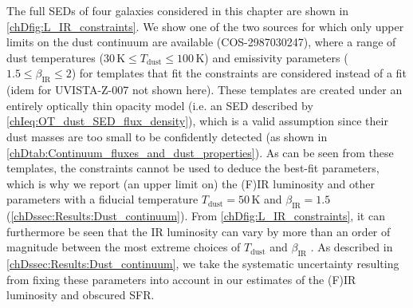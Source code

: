 The full SEDs of four galaxies considered in this chapter are shown in \cref{chDfig:L_IR_constraints}. We show one of the two sources for which only upper limits on the dust continuum are available (COS-2987030247), where a range of dust temperatures ($30 \, \mathrm{K} \leq T_\text{dust} \leq 100 \, \mathrm{K}$) and emissivity parameters ($1.5 \leq \beta_\text{IR} \leq 2$) for templates that fit the constraints are considered instead of a  fit (idem for UVISTA-Z-007 not shown here). These templates are created under an entirely optically thin opacity model (i.e. an SED described by \cref{chIeq:OT_dust_SED_flux_density}), which is a valid assumption since their dust masses are too small to be confidently detected (as shown in \cref{chDtab:Continuum_fluxes_and_dust_properties}). As can be seen from these templates, the constraints cannot be used to deduce the best-fit parameters, which is why we report (an upper limit on) the (F)IR luminosity and other parameters with a fiducial temperature $T_\text{dust} = 50 \, \mathrm{K}$ and $\beta_\text{IR} = 1.5$ (\cref{chDssec:Results:Dust_continuum}). From \cref{chDfig:L_IR_constraints}, it can furthermore be seen that the IR luminosity can vary by more than an order of magnitude between the most extreme choices of $T_\text{dust}$ and $\beta_\text{IR}$ \citep[see also][]{2020RSOS....700556H}. As described in \cref{chDssec:Results:Dust_continuum}, we take the systematic uncertainty resulting from fixing these parameters into account in our estimates of the (F)IR luminosity and obscured SFR.

